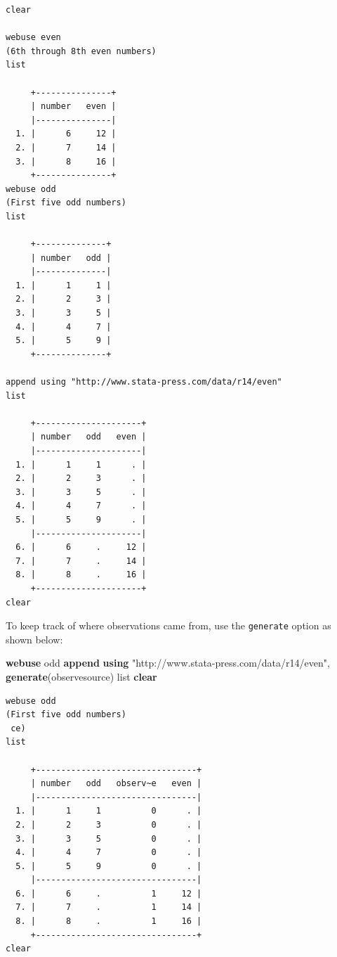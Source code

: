 \documentclass[]{book}
\newenvironment{Shaded}{\begin{snugshade}}{\end{snugshade}}
\newcommand{\KeywordTok}[1]{\textcolor[rgb]{0.13,0.29,0.53}{\textbf{#1}}}
\newcommand{\NormalTok}[1]{#1}
\newcommand{\OtherTok}[1]{\textcolor[rgb]{0.56,0.35,0.01}{#1}}
\newcommand{\StringTok}[1]{\textcolor[rgb]{0.31,0.60,0.02}{#1}}
\begin{document}
\begin{verbatim}
clear

webuse even
(6th through 8th even numbers)
list

     +---------------+
     | number   even |
     |---------------|
  1. |      6     12 |
  2. |      7     14 |
  3. |      8     16 |
     +---------------+
webuse odd
(First five odd numbers)
list

     +--------------+
     | number   odd |
     |--------------|
  1. |      1     1 |
  2. |      2     3 |
  3. |      3     5 |
  4. |      4     7 |
  5. |      5     9 |
     +--------------+

append using "http://www.stata-press.com/data/r14/even"
list

     +---------------------+
     | number   odd   even |
     |---------------------|
  1. |      1     1      . |
  2. |      2     3      . |
  3. |      3     5      . |
  4. |      4     7      . |
  5. |      5     9      . |
     |---------------------|
  6. |      6     .     12 |
  7. |      7     .     14 |
  8. |      8     .     16 |
     +---------------------+
clear
\end{verbatim}

To keep track of where observations came from, use the \texttt{generate} option as shown below:

\begin{Shaded}
\begin{Highlighting}[]
  \KeywordTok{webuse}\NormalTok{ odd}
  \KeywordTok{append} \KeywordTok{using} \StringTok{"http://www.stata-press.com/data/r14/even"}\NormalTok{, }\KeywordTok{generate}\NormalTok{(observesource)}
  \OtherTok{list}
  \KeywordTok{clear}
\end{Highlighting}
\end{Shaded}

\begin{verbatim}
webuse odd
(First five odd numbers)
 ce)
list

     +--------------------------------+
     | number   odd   observ~e   even |
     |--------------------------------|
  1. |      1     1          0      . |
  2. |      2     3          0      . |
  3. |      3     5          0      . |
  4. |      4     7          0      . |
  5. |      5     9          0      . |
     |--------------------------------|
  6. |      6     .          1     12 |
  7. |      7     .          1     14 |
  8. |      8     .          1     16 |
     +--------------------------------+
clear
\end{verbatim}
\end{document}
